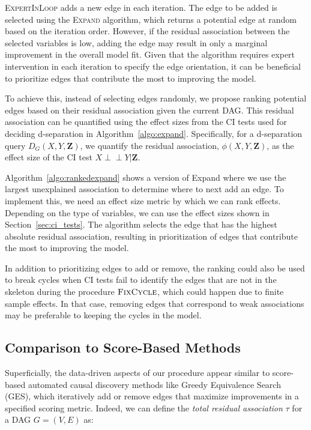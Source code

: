 \documentclass[accepted]{uai2025} %
\def\ci{\perp\!\!\!\!\perp}
\begin{document}
\textsc{ExpertInLoop} adds a new edge in each iteration. The edge
to be added is selected using the \textsc{Expand} algorithm, which 
returns a potential edge at random based on the iteration order. 
However, if the residual association between the selected variables 
is low, adding the edge may result in only a marginal improvement 
in the overall model fit. Given that the
algorithm requires expert intervention in each iteration to specify the edge
orientation, it can be beneficial to prioritize edges that contribute 
the most to improving the model.

To achieve this, instead of selecting edges randomly, we propose ranking
potential edges based on their residual association given the current DAG. This
residual association can be quantified using the effect sizes from the
CI tests used for deciding d-separation in Algorithm~\ref{algo:expand}.
Specifically, for a d-separation query $D_G(X, Y, \mathbf{Z}) $, we quantify
the residual association, $ \phi(X, Y, \bm{Z}) $, as the effect size of the CI
test $X \ci Y \rvert \bm{Z} $. 

Algorithm~\ref{algo:rankedexpand} shows a 
version of {\sc Expand} where we use the largest unexplained association to
determine where to next add an edge. 
To implement this, we need an effect size
metric by which we can rank effects. Depending on the type of variables, 
we can use the effect sizes shown in Section~\ref{sec:ci_tests}. 
The algorithm selects the edge that has the highest absolute residual 
association, resulting
in prioritization of edges that contribute the most to improving the model.

In addition to prioritizing edges to add or remove, the ranking could also
be used to break cycles when CI tests fail to identify the edges that are not
in the skeleton during the procedure  $\textsc{FixCycle}$, which could happen
due to finite sample effects. In that case, removing edges that correspond to 
weak associations may be preferable to keeping the cycles in the model.

\subsection{Comparison to Score-Based Methods}

Superficially, the data-driven aspects of our procedure appear
 similar to score-based automated causal discovery methods like 
Greedy Equivalence Search (GES), which 
iteratively add or remove edges that maximize improvements in a specified
scoring metric. Indeed, we can define the \emph{total residual association}
 $ \tau $ for a DAG $ G = (V, E) $ as:
\end{document}
